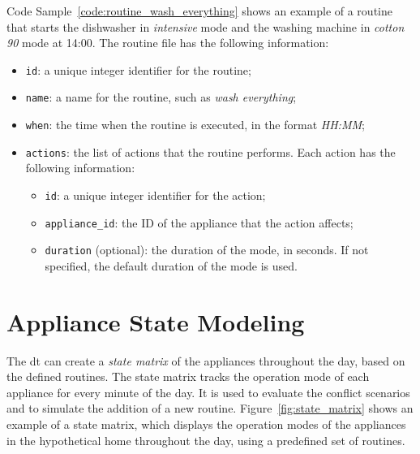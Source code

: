 Code Sample~\ref{code:routine_wash_everything} shows an example of a routine that starts the dishwasher in \textit{intensive} mode and the washing machine in \textit{cotton 90} mode at 14:00. The routine file has the following information:
\begin{itemize}
    \item \texttt{id}: a unique integer identifier for the routine;
    \item \texttt{name}: a name for the routine, such as \textit{wash everything};
    \item \texttt{when}: the time when the routine is executed, in the format \textit{HH:MM};
    \item \texttt{actions}: the list of actions that the routine performs. Each action has the following information:
    \begin{itemize}
        \item \texttt{id}: a unique integer identifier for the action;
        \item \texttt{appliance\_id}: the ID of the appliance that the action affects;
        \item \texttt{duration} (optional): the duration of the mode, in seconds. If not specified, the default duration of the mode is used.
    \end{itemize}
\end{itemize}



\section{Appliance State Modeling}

The \acrshort{dt} can create a \textit{state matrix} of the appliances throughout the day, based on the defined routines. The state matrix tracks the operation mode of each appliance for every minute of the day. It is used to evaluate the conflict scenarios and to simulate the addition of a new routine. Figure~\ref{fig:state_matrix} shows an example of a state matrix, which displays the operation modes of the appliances in the hypothetical home throughout the day, using a predefined set of routines.

